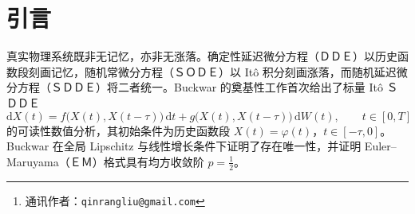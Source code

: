 \documentclass[12pt,a4paper]{ctexart}
\title{\heifont{\textbf{耦合随机延迟网络中的智能涌现阈值：\\
面向物理类脑硬件的自由能视角}}}
\author{刘勤让\thanks{通讯作者：\texttt{qinrangliu@gmail.com}}\\
\small 网络时空协同复杂度涌现智能研究院（iNEST）}
\date{\today}
\newcommand{\heifont}[1]{{\CJKfamily{yahei}#1}}
\newcommand{\kai}[1]{{\CJKfamily{kai}#1}}
\newcommand{\dd}{\mathrm{d}}
\begin{document}
\maketitle

\begin{abstract}
\hspace{2em}本文将 Buckwar 关于单节点随机延迟微分方程（ＳＤＤＥ）的经典数值分析框架，推广为由空间非均匀延迟矩阵与空间相关噪声矩阵支配的 $N$ 节点异质异构耦合网络，以适配晶圆级、异质异构集成的液态硬件类神经网络的物理实现。在全局 Lipschitz 与线性增长条件下，本文借助步进法与延迟 Grönwall 不等式，证明了逐轨道唯一强解的存在唯一性（命题~\ref{prop:existence}）。进而，本文导出了由单一标量序参量——\kai{时空协同复杂度指标}$\Theta$——支配的闭式\kai{涌现阈值判据}（定理~\ref{thm:threshold}），并在 Khasminskii 型单边条件下证明了一个\kai{尖锐的非线性二分律}（定理~\ref{thm:nonlinear}）：同一常数 $\Theta^{\ast}$ 既保证阈下的全局均方指数稳定，又迫使阈上失稳并涌现结构化动力学。本文以一个含超线性 $\tanh$ 节点与乘性噪声的两节点网络，闭式验证了上述两种态（第~\ref{sec:example}~节）。借助自由能原理诠释 $\Theta^{\ast}$，阈值穿越被映射为六个涌现智能等级；延迟矩阵将孤立分岔点展开为有限宽度的分岔带——这正是记忆抬升可达智能等级的解析机制。数值结果与 Euler–Maruyama 格式的均方半阶收敛一致。
\medskip

\noindent\heifont{关键词：}随机延迟微分方程；复杂网络；涌现阈值；自由能原理；类脑硬件；均方稳定性。
\end{abstract}

\section{引言}\label{sec:intro}

\hspace{2em}真实物理系统既非无记忆，亦非无涨落。确定性延迟微分方程（ＤＤＥ）以历史函数段刻画记忆，随机常微分方程（ＳＯＤＥ）以 Itô 积分刻画涨落，而随机延迟微分方程（ＳＤＤＥ）将二者统一。Buckwar 的奠基性工作首次给出了标量 Itô ＳＤＤＥ
\begin{equation}\label{eq:scalar-sdde}
\dd X(t)=f\bigl(X(t),X(t-\tau)\bigr)\,\dd t+g\bigl(X(t),X(t-\tau)\bigr)\,\dd W(t),\qquad t\in[0,T]
\end{equation}
的可读性数值分析，其初始条件为历史函数段 $X(t)=\varphi(t)$，$t\in[-\tau,0]$。Buckwar 在全局 Lipschitz 与线性增长条件下证明了存在唯一性，并证明 Euler–Maruyama（ＥＭ）格式具有均方收敛阶 $p=\tfrac12$。
\end{document}
